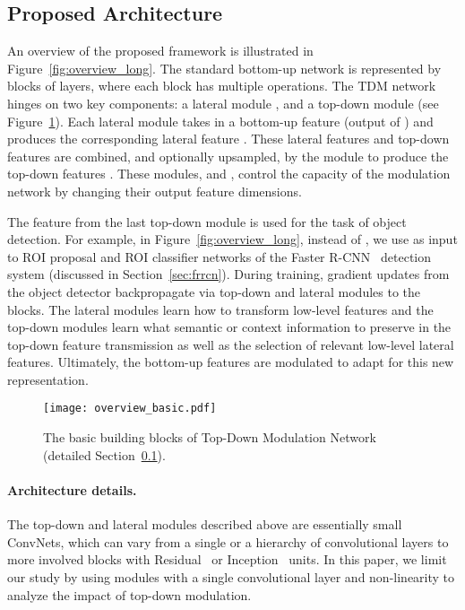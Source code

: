 \documentclass[10pt,twocolumn,letterpaper]{article}
\begin{document}
\vspace{-0.02in}
\subsection{Proposed Architecture}\label{sec:arch_details}
\vspace{-0.01in}
An overview of the proposed framework is illustrated in Figure~\ref{fig:overview_long}.
The standard bottom-up network is represented by blocks of layers, where each block  has multiple operations. The TDM network hinges on two key components: a lateral module , and a top-down module  (see Figure~\ref{fig:overview_short}). Each lateral module  takes in a bottom-up feature  (output of ) and produces the corresponding lateral feature . These lateral features  and top-down features  are combined, and optionally upsampled, by the  module to produce the top-down features . These modules,  and , control the capacity of the modulation network by changing their output feature dimensions. 

The feature from the last top-down module  is used for the task of object detection. For example, in Figure~\ref{fig:overview_long}, instead of , we use  as input to ROI proposal and ROI classifier networks of the Faster R-CNN~\cite{ren2015faster} detection system (discussed in Section~\ref{sec:frrcn}). During training, gradient updates from the object detector backpropagate via top-down and lateral modules to the  blocks. The lateral modules  learn how to transform low-level features and the top-down modules  learn what semantic or context information to preserve in the top-down feature transmission as well as the selection of relevant low-level lateral features. Ultimately, the bottom-up features are modulated to adapt for this new representation. 

\begin{figure}[t]
    \centering
    \texttt{[image: overview\_basic.pdf]}
    \caption{The basic building blocks of Top-Down Modulation Network (detailed Section~\ref{sec:arch_details}).
    }
    \label{fig:overview_short}
    \vspace{-0.1in}
\end{figure}

\vspace{-0.15in}
\paragraph{Architecture details.} The top-down and lateral modules described above are essentially small ConvNets, which can vary from a single or a hierarchy of convolutional layers to more involved blocks with Residual~\cite{resnet} or Inception~\cite{szegedy2016inception} units. In this paper, we limit our study by using modules with a single convolutional layer and non-linearity to analyze the impact of top-down modulation.
\end{document}
